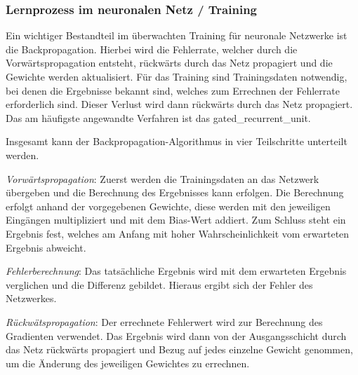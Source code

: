 



\subsubsection{Lernprozess im neuronalen Netz / Training}

Ein wichtiger Bestandteil im überwachten Training für neuronale Netzwerke ist die Backpropagation. Hierbei wird die Fehlerrate, welcher durch die Vorwärtspropagation entsteht, rückwärts durch das Netz propagiert und die Gewichte werden aktualisiert. Für das Training sind Trainingsdaten notwendig, bei denen die Ergebnisse bekannt sind, welches zum Errechnen der Fehlerrate erforderlich sind. Dieser Verlust wird dann rückwärts durch das Netz propagiert. Das am häufigste angewandte Verfahren ist das \gls{gated_recurrent_unit}.\vspace{0.2cm}

Insgesamt kann der Backpropagation-Algorithmus in vier Teilschritte unterteilt werden.\vspace{0.2cm}

\textit{Vorwärtspropagation}: Zuerst werden die Trainingsdaten an das Netzwerk übergeben und die Berechnung des Ergebnisses kann erfolgen. Die Berechnung erfolgt anhand der vorgegebenen Gewichte, diese werden mit den jeweiligen Eingängen multipliziert und mit dem Bias-Wert addiert. Zum Schluss steht ein Ergebnis fest, welches am Anfang mit hoher Wahrscheinlichkeit vom erwarteten Ergebnis abweicht.\vspace{0.2cm}

\textit{Fehlerberechnung}: Das tatsächliche Ergebnis wird mit dem erwarteten Ergebnis verglichen und die Differenz gebildet. Hieraus ergibt sich der Fehler des Netzwerkes.\vspace{0.2cm}

\textit{Rückwätspropagation}: Der errechnete Fehlerwert wird zur Berechnung des Gradienten verwendet. Das Ergebnis wird dann von der Ausgangsschicht durch das Netz rückwärts propagiert und Bezug auf jedes einzelne Gewicht genommen, um die Änderung des jeweiligen Gewichtes zu errechnen.\vspace{0.2cm}

